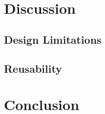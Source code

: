 \documentclass[11pt]{article}
\begin{document}
\section{Discussion}
\label{sec:discussion}


\subsection{Design Limitations}
\label{subsec:limitations}

\subsection{Reusability}
\label{subsec:reusability}


\section{Conclusion}
\label{sec:conclusion}
\end{document}
